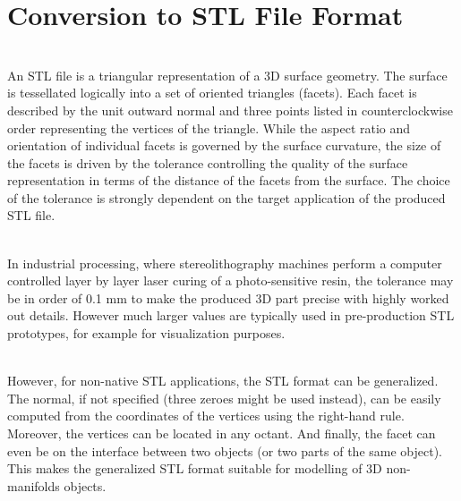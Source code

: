 \documentclass[12pt,a4paper]{report}
\begin{document}
	\section{Conversion to STL File Format}
	\indent
	\\An STL file is a triangular representation of a 3D surface geometry. The surface is tessellated
	logically into a set of oriented triangles (facets). Each facet is described by the unit outward normal
	and three points listed in counterclockwise order representing the vertices of the triangle. While the
	aspect ratio and orientation of individual facets is governed by the surface curvature, the size of the
	facets is driven by the tolerance controlling the quality of the surface representation in terms of the
	distance of the facets from the surface. The choice of the tolerance is strongly dependent on the
	target application of the produced STL file.\par
	\indent
	\\In industrial processing, where stereolithography machines perform a computer controlled
	layer by layer laser curing of a photo-sensitive resin, the tolerance may be in order of 0.1 mm to
	make the produced 3D part precise with highly worked out details. However much larger values are
	typically used in pre-production STL prototypes, for example for visualization purposes.\par
	\indent
	\\However, for non-native STL applications, the STL format can be generalized. The normal, if
	not specified (three zeroes might be used instead), can be easily computed from the coordinates of
	the vertices using the right-hand rule. Moreover, the vertices can be located in any octant. And
	finally, the facet can even be on the interface between two objects (or two parts of the same object).
	This makes the generalized STL format suitable for modelling of 3D non-manifolds objects.\par
\end{document}
